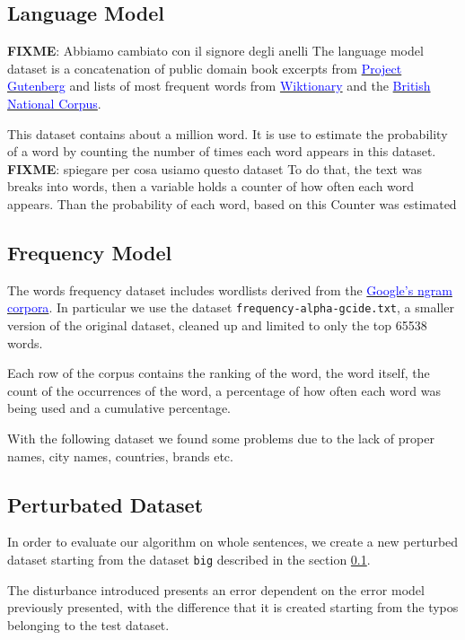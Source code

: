 \subsection{Language Model}
\label{subsection:languagemodel}
\textbf{FIXME}: Abbiamo cambiato con il signore degli anelli
The language model dataset is a concatenation of public domain book excerpts from 
\href{http://www.gutenberg.org/wiki/Main_Page}{ \textcolor{blue}{Project Gutenberg}}  and lists of most frequent words 
from \href{https://en.wiktionary.org/wiki/Wiktionary:Frequency_lists}{ \textcolor{blue}{Wiktionary}} and the 
\href{http://www.kilgarriff.co.uk/bnc-readme.html}{\textcolor{blue}{British National Corpus}}. 

This dataset contains about a million word. It is use to estimate the probability of a word by counting the number of times 
each word appears in this dataset. \textbf{FIXME}: spiegare per cosa usiamo questo dataset  To do that, the text was 
breaks into words, then a variable holds a counter of how often each word appears. Than the  probability of each word, 
based on this Counter was estimated

\subsection{Frequency Model}
The words frequency dataset includes wordlists derived from the \href{https://books.google.com/ngrams/}{ 
\textcolor{blue}{Google's ngram corpora}}. In particular we use the dataset \texttt{frequency-alpha-gcide.txt}, a smaller 
version of the original dataset, cleaned up and limited to only the top \num{65538} words.

Each row of the corpus contains the ranking of the word, the word itself, the count of the occurrences of the word, a 
percentage of how often each word was being used and a cumulative percentage.

With the following dataset we found some problems due to the lack of proper names, city names, countries, brands etc.

\subsection{Perturbated Dataset}
In order to evaluate our algorithm on whole sentences, we create a new perturbed dataset starting from the dataset 
\texttt{big} described in the section \ref{subsection:languagemodel}.

The disturbance introduced presents an error dependent on the error model previously presented, with the 
difference that it is created starting from the typos belonging to the test dataset.

